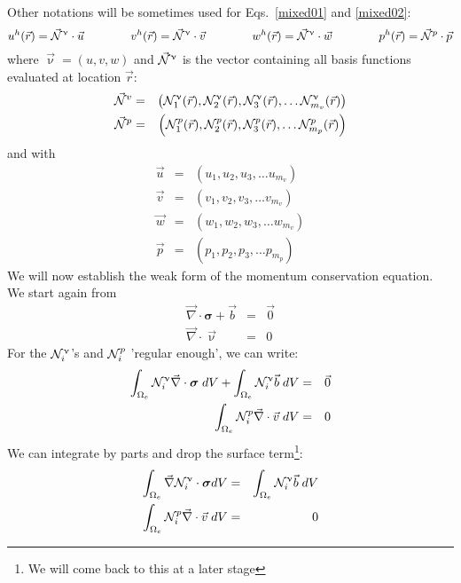Other notations will be sometimes used for Eqs.~\eqref{mixed01} and \eqref{mixed02}:
\begin{equation}
u^h({\vec r}) = \vec{{\mathcal{N}}}^\upnu \cdot \vec{u}
\quad\quad\quad\quad
v^h({\vec r}) = \vec{{\mathcal{N}}}^\upnu \cdot \vec{v}
\quad\quad\quad\quad
w^h({\vec r}) = \vec{{\mathcal{N}}}^\upnu \cdot \vec{w}
\quad\quad\quad\quad
p^h({\vec r}) = \vec{{\mathcal{N}}}^p \cdot \vec{p}
\end{equation} 
where ${\vec \upnu}=(u,v,w)$ and $\vec{{\mathcal{N}}}^\upnu$ is the vector containing 
all basis functions evaluated at location ${\vec r}$:
\begin{eqnarray}
\vec{{\mathcal{N}}}^v &=& \left( {\mathcal{N}}_1^\upnu({\vec r}),  {\mathcal{N}}_2^\upnu({\vec r}),  
{\mathcal{N}}_3^\upnu({\vec r}), \dots  {\mathcal{N}}_{m_v}^\upnu({\vec r}) \right) \\
\vec{{\mathcal{N}}}^p &=& \left( {\mathcal{N}}_1^p({\vec r}),  {\mathcal{N}}_2^p({\vec r}),  
{\mathcal{N}}_3^p({\vec r}), \dots  {\mathcal{N}}_{m_p}^p({\vec r}) \right)
\end{eqnarray}
and with 
\begin{eqnarray}
\vec{u} &=& \left( u_1,  u_2,  u_3, \dots  u_{m_v} \right) \\
\vec{v} &=& \left( v_1,  v_2,  v_3, \dots  v_{m_v} \right) \\
\vec{w} &=& \left( w_1,  w_2,  w_3, \dots  w_{m_v} \right) \\
\vec{p} &=& \left( p_1,  p_2,  p_3, \dots  p_{m_p} \right) 
\end{eqnarray}
We will now establish the weak form of the momentum conservation equation. 
We start again from 
\begin{eqnarray}
{\vec \nabla}\cdot {\bm \sigma} + {\vec b} &=& {\vec 0} \\
{\vec \nabla}\cdot {\vec \upnu} &=& 0
\end{eqnarray}
For the ${\mathcal{N}}_i^\upnu$'s and ${\mathcal{N}}_i^p$ 'regular enough', we can write:
\begin{eqnarray}
\int_{\Omega_e} {\mathcal{N}}_i^\upnu {\vec \nabla}\cdot {\bm \sigma}\;  dV
+ \int_{\Omega_e} {\mathcal{N}}_i^\upnu  {\vec b} \; dV
&=& \vec 0 \\
\int_{\Omega_e} {\mathcal{N}}_i^p {\vec \nabla}\cdot {\vec v} \; dV &=& 0
\end{eqnarray}
We can integrate by parts and drop the surface term\footnote{We will come back to this at a later stage}:
\begin{eqnarray}
\int_{\Omega_e} {\vec \nabla } {\mathcal{N}}_i^\upnu \cdot {\bm \sigma} dV
&=& \int_{\Omega_e} {\mathcal{N}}_i^\upnu  {\vec b} \; dV \\
\int_{\Omega_e} {\mathcal{N}}_i^p {\vec \nabla}\cdot {\vec v} \; dV &=& 0
\end{eqnarray}
